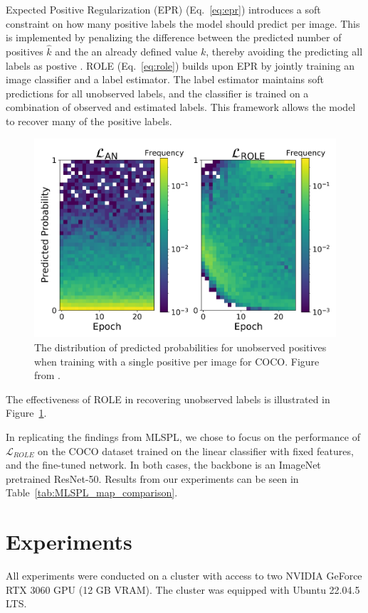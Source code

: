 \documentclass[lettersize,journal]{IEEEtran}
\begin{document}
Expected Positive Regularization (EPR) (Eq.~\ref{eq:epr}) introduces a soft constraint on how many positive labels the model should predict per image. This is implemented by penalizing the difference between the predicted number of positives $\hat{k}$ and the an already defined value $k$, thereby avoiding the predicting all labels as postive \cite{mlsp}. ROLE (Eq.~\ref{eq:role}) builds upon EPR by jointly training an image classifier and a label estimator. The label estimator maintains soft predictions for all unobserved labels, and the classifier is trained on a combination of observed and estimated labels. This framework allows the model to recover many of the positive labels.

\begin{figure}[t]
    \centering
    \includegraphics[width=.8\linewidth]{images/mlsp_fig2.png}
    \caption{The distribution of predicted probabilities for unobserved positives when training with a single positive per image for COCO. Figure from \cite{mlsp}.}
    \label{fig:mlsp_fig2}
\end{figure}

The effectiveness of ROLE in recovering unobserved labels is illustrated in Figure~\ref{fig:mlsp_fig2}. 

In replicating the findings from MLSPL, we chose to focus on the performance of $\mathcal{L}_{ROLE}$ on the COCO dataset trained on the linear classifier with fixed features, and the fine-tuned network. In both cases, the backbone is an ImageNet pretrained ResNet-50. Results from our experiments can be seen in Table~\ref{tab:MLSPL_map_comparison}.


\section{Experiments}
All experiments were conducted on a cluster with access to two NVIDIA GeForce RTX 3060 GPU (12 GB VRAM). The cluster was equipped with Ubuntu 22.04.5 LTS.
\end{document}
